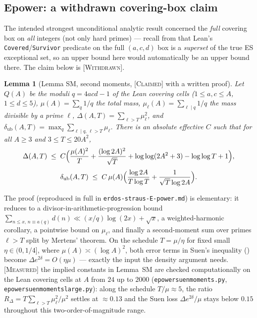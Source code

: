 \documentclass[11pt]{article}
\theoremstyle{plain}
\newtheorem{lemma}[theorem]{Lemma}
\theoremstyle{definition}
\theoremstyle{remark}
\newcommand{\CLAIMED}{\textcolor{claimed}{\textsc{[Claimed]}}}
\newcommand{\WITHDRAWN}{\textcolor{negative}{\textsc{[Withdrawn]}}}
\newcommand{\MEASURED}{\textcolor{claimed}{\textsc{[Measured]}}}
\newcommand{\file}[1]{\texttt{#1}}
\newcommand{\lean}[1]{\texttt{#1}}
\renewcommand{\_}{\textunderscore\allowbreak}
\begin{document}
\subsection{E\_power: a withdrawn covering-box claim}
\label{subsec:epower}

The intended strongest unconditional analytic result concerned the \emph{full}
covering box on \emph{all} integers (not only hard primes) — recall from 
that Lean's \lean{Covered}/\lean{Survivor} predicate on the full $(a,c,d)$ box is a
\emph{superset} of the true ES exceptional set, so an upper bound here would automatically be an upper
bound there. The claim below is \WITHDRAWN{}.

\begin{lemma}[Lemma SM, second moments, \CLAIMED{} with a written proof]
\label{lem:sm}
Let $Q(A)$ be the moduli $q=4acd-1$ of the Lean covering cells ($1\le a,c\le A$, $1\le d\le5$),
$\mu(A)=\sum_q 1/q$ the total mass, $\mu_\ell(A)=\sum_{\ell\mid q}1/q$ the mass divisible by a
prime $\ell$, $\Delta(A,T)=\sum_{\ell>T}\mu_\ell^2$, and
$\delta_{\mathrm{ub}}(A,T)=\max_q\sum_{\ell\mid q,\,\ell>T}\mu_\ell$. There is an absolute
effective $C$ such that for all $A\ge3$ and $3\le T\le20A^2$,
\[
\Delta(A,T) \;\le\; C\Bigl(\frac{\mu(A)^2}{T}+\frac{(\log2A)^2}{\sqrt T}
+\log\log(2A^2+3)-\log\log T+1\Bigr),
\]
\[
\delta_{\mathrm{ub}}(A,T) \;\le\; C\,\mu(A)\Bigl(\frac{\log2A}{T\log T}+\frac1{\sqrt T\log2A}\Bigr).
\]
\end{lemma}
The proof (reproduced in full in \texttt{erdos-\allowbreak straus-\allowbreak E-\allowbreak power.md}) is elementary: it reduces to a
divisor-in-arithmetic-progression bound $\sum_{n\le x,\,n\equiv a(q)}d(n)\ll (x/q)\log(2x)+\sqrt
x$, a weighted-harmonic corollary, a pointwise bound on $\mu_\ell$, and finally a second-moment
sum over primes $\ell>T$ split by Mertens' theorem. On the schedule $T=\mu/\eta$ for fixed small
$\eta\in(0,1/4]$, where $\mu(A)\asymp(\log A)^2$, both error terms in Suen's inequality
() become $\Delta e^{2\delta}=O(\eta\mu)$ — exactly the input the density
argument needs. \MEASURED{} the implied constants in Lemma~SM are checked computationally on the
Lean covering cells at $A$ from $24$ up to $2000$ (\file{e\_power\_suen\_moments.py},
\file{e\_power\_suen\_moments\_large.py}): along the schedule $T/\mu\approx5$, the ratio
$R_\Delta=T\sum_{\ell>T}\mu_\ell^2/\mu^2$ settles at $\approx0.13$ and the Suen loss
$\Delta e^{2\delta}/\mu$ stays below $0.15$ throughout this two-order-of-magnitude range.
\end{document}

